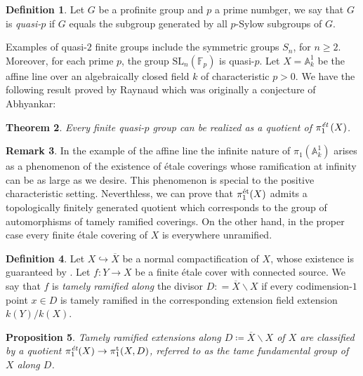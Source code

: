 \documentclass[10pt,a4paper]{amsart}
\numberwithin{equation}{subsection}
\theoremstyle{plain}
\newtheorem{theorem}{Theorem}[section]
\newtheorem{prop}[theorem]{Proposition}
\theoremstyle{definition}
\newtheorem{defi}[theorem]{Definition}
\newtheorem{rema}[theorem]{Remark}
\theoremstyle{remark}
\numberwithin{equation}{section}
\begin{document}
\begin{defi}
Let $G$ be a profinite group and $p$ a prime numbger, we say that $G$ is \emph{quasi-$p$} if $G$ equals the subgroup generated by all $p$-Sylow subgroups of $G$.
\end{defi}

Examples of quasi-$2$ finite groups include the symmetric groups $S_n$, for $n \geq 2$. Moreover, for each prime $p$, the group $\mathrm{SL}_n(\mathbb F_p)$ is quasi-$p$.
Let $X = \mathbb A^1_k$ be the affine line over an algebraically closed field $k$ of characteristic $p>0$. 
We have the following result proved by Raynaud which was originally a conjecture of Abhyankar:

\begin{theorem}{\cite[Conjecture 10]{Clark}} 
Every finite quasi-$p$ group can be realized as a quotient of $\pi_1^{\emph{\text{\'et}}} \left(X \right)$.
\end{theorem}

\begin{rema}
In the example of the affine line the infinite nature of $\pi_1(\mathbb A^1_k )$ arises as a phenomenon of the existence of \'etale coverings whose ramification at infinity can be as large as we desire. This phenomenon is special to the positive characteristic
setting.
Neverthless, we can prove that $\pi_1^{\text{\'et}}(X)$ admits a topologically finitely generated quotient which corresponds to the group of automorphisms of tamely ramified coverings. On the other hand, in the proper case every finite \'etale
covering of $X$ is everywhere unramified.
\end{rema}


\begin{defi}
Let $X \hookrightarrow \overline{X}$ be a normal compactification of $X$, whose existence is guaranteed by \cite{nagata}. Let
$f \colon Y \to X$ be a finite \'etale cover with connected source.
We say that $f$ is \emph{tamely ramified along} the divisor $D : = \overline{X} \backslash X$ if every codimension-$1$ point $x \in D$ is
tamely ramified in the corresponding extension field extension $k(Y) / k(X)$. 
\end{defi}

\begin{prop}
Tamely ramified extensions along $D \coloneqq \overline{X} \backslash X$ of $X$ are classified by a quotient $\pi_1^{\emph{\text{\'et}}}(X) \to \pi_1^{\mathrm{t}}(X, D)$,
referred to as the \emph{tame fundamental group of $X$ along $D$}.
\end{prop}
\end{document}
